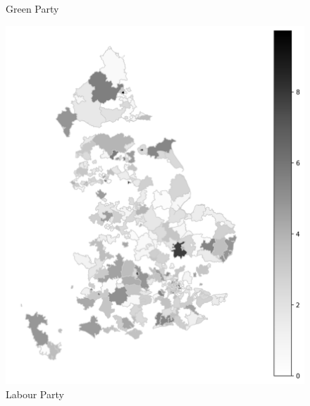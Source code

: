 \documentclass[12pt,letterpaper]{article}
\begin{document}
\begin{figure}[H]
\begin{minipage}[t]{0.335\textwidth}
		\caption{Green Party}
	\end{minipage}\hfill
	\begin{minipage}[t]{0.335\textwidth}
		\centering
		\includegraphics[width=\textwidth,height=0.68\textheight,keepaspectratio]{plots/LabourParty_2010GeneralElection_Environmental_Mentions.png}
		\caption{Labour Party}
	\end{minipage}
	
	\vspace{0.1cm} %
	

\end{figure}
\end{document}
